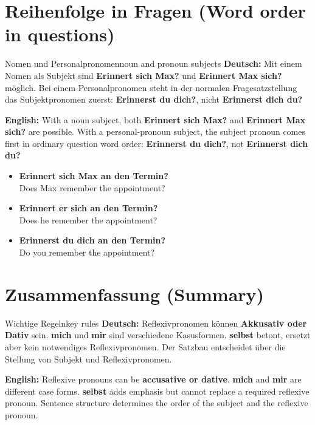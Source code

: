 \documentclass[a4paper,11pt]{article}
\newcommand{\GermanText}[1]{\textbf{Deutsch: }#1\par}
\newcommand{\EnglishText}[1]{{\small\color{SoftGray}\textbf{English: }#1\par}}
\newcommand{\ExampleItem}[2]{\item \textbf{#1}\\{\small\color{SoftGray}#2}}
\begin{document}
\section{Reihenfolge in Fragen (Word order in questions)}

    \begin{grammarentry}{Nomen und Personalpronomen}{noun and pronoun subjects}
        \GermanText{Mit einem Nomen als Subjekt sind \textbf{Erinnert sich Max?} und \textbf{Erinnert Max sich?} möglich. Bei einem Personalpronomen steht in der normalen Fragesatzstellung das Subjektpronomen zuerst: \textbf{Erinnerst du dich?}, nicht \textbf{Erinnerst dich du?}}
        \EnglishText{With a noun subject, both \textbf{Erinnert sich Max?} and \textbf{Erinnert Max sich?} are possible. With a personal-pronoun subject, the subject pronoun comes first in ordinary question word order: \textbf{Erinnerst du dich?}, not \textbf{Erinnerst dich du?}}
        \begin{exbox}
            \begin{itemize}
                \ExampleItem{Erinnert sich Max an den Termin?}{Does Max remember the appointment?}
                \ExampleItem{Erinnert er sich an den Termin?}{Does he remember the appointment?}
                \ExampleItem{Erinnerst du dich an den Termin?}{Do you remember the appointment?}
            \end{itemize}
        \end{exbox}
    \end{grammarentry}

\section{Zusammenfassung (Summary)}

    \begin{grammarentry}{Wichtige Regeln}{key rules}
        \GermanText{Reflexivpronomen können \textbf{Akkusativ oder Dativ} sein. \textbf{mich} und \textbf{mir} sind verschiedene Kasusformen. \textbf{selbst} betont, ersetzt aber kein notwendiges Reflexivpronomen. Der Satzbau entscheidet über die Stellung von Subjekt und Reflexivpronomen.}
        \EnglishText{Reflexive pronouns can be \textbf{accusative or dative}. \textbf{mich} and \textbf{mir} are different case forms. \textbf{selbst} adds emphasis but cannot replace a required reflexive pronoun. Sentence structure determines the order of the subject and the reflexive pronoun.}
    \end{grammarentry}
\end{document}
